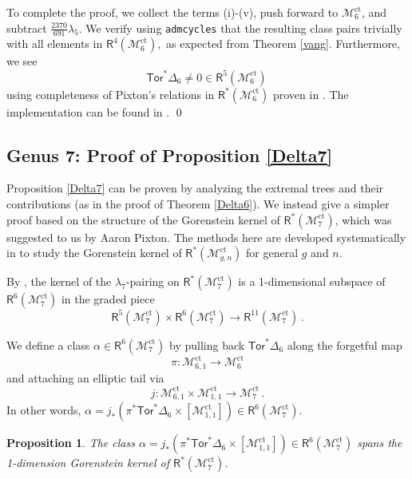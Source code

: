 \documentclass[11pt]{amsart}
\newtheorem{prop}[thm]{Proposition}
\theoremstyle{definition}
\newcommand{\R}{\mathsf{R}}
\newcommand{\M}{\mathcal{M}}
\DeclareMathOperator{\ct}{ct}
\newcommand{\Tor}{\mathsf{Tor}}
\begin{document}
{To complete the proof, we collect the terms (i)-(v), push forward to $\M_6^{\ct}$, and subtract $\frac{2370}{691}\lambda_5.$ 
We verify using \texttt{admcycles} \cite{admcycles} that the resulting class pairs trivially with all elements in $\mathsf{R}^4(\M_6^{\ct}),$ as expected from Theorem \ref{vang}. Furthermore, we see
$$
\Tor^*\Delta_6\neq 0 \in
\mathsf{R}^5(\M_6^{\ct})\, $$
using completeness of Pixton's relations
in $\mathsf{R}^*(\M_6^{\ct})$ proven in \cite{CLS}.
The implementation can be found in \cite{COP}.  \qed

\subsection{Genus 7: Proof of Proposition \ref{Delta7}}
\label{g777}
 Proposition \ref{Delta7} can be proven by analyzing the extremal trees and their contributions (as
 in the proof of Theorem \ref{Delta6}).
 We instead give a simpler proof based on the structure of the Gorenstein kernel of $\R^*(\M_7^{\ct})$, which was suggested to us by Aaron Pixton. The methods here are developed systematically in
 \cite{CLS} to study the 
 Gorenstein kernel of 
 $\mathsf{R}^*(\M_{g,n}^{\ct})$ for
 general $g$ and $n$.
 
   By \cite{CLS}, the kernel of the $\lambda_7$-pairing
   on $\R^*(\M_7^{\ct})$ is a 1-dimensional
   subspace of $\R^6(\M_7^{\ct})$ in the
   graded piece
   \begin{equation}
   \label{xxvvb}
   \R^5(\M_7^{\ct})\times \R^6(\M_7^{\ct})\rightarrow \R^{11}(\M_7^{\ct})\,.
   \end{equation}

   
   
   
   We define
   a class
    $\alpha\in \R^6(\M_7^{\ct})$
    by
    pulling back $\Tor^*\Delta_6$ along the forgetful map $$\pi:\M_{6,1}^{\ct}\rightarrow \M_6^{\ct}$$ and attaching an elliptic tail via
$$j:\M^{\ct}_{6,1}\times \M_{1,1}^{\ct}\to \M_7^{\ct}\, .$$
In other words,
$\alpha= j_*(\pi^*\Tor^*\Delta_6 \times [\M_{1,1}^{\ct}])
\in \R^6(\M_7^{\ct})$.


\begin{prop} \label{p777}
The class
$\alpha= j_*(\pi^*\Tor^*\Delta_6 \times [\M_{1,1}^{\ct}])
\in \R^6(\M_7^{\ct})$
spans the 1-dimension Gorenstein kernel of $\mathsf{R}^*(\M_7^{\ct})$.
\end{prop}


}
\end{document}
